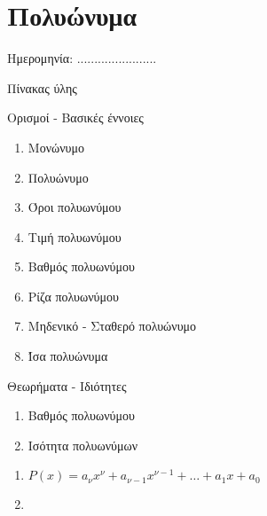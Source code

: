 \documentclass[twoside,nofonts,internet,math,spyros]{frontisthrio}
\newcommand{\myitem}{\stepcounter{enumi}\item[\raisebox{0.5mm}{\faExclamationTriangle}\ \Large$\square$]}
\begin{document}
\section{Πολυώνυμα}
\begin{flushright}
\faCalendar* Ημερομηνία: .......................
\end{flushright}
\begin{mybox}[mysubtitle]{Πίνακας ύλης}
\begin{tcbraster}[raster columns=2,raster equal height]
\begin{myleftbox}{Ορισμοί - Βασικές έννοιες\ \ \faBook}
\begin{enumerate}[itemsep=0mm]
\item Μονώνυμο
\item Πολυώνυμο
\item Όροι πολυωνύμου
\item Τιμή πολυωνύμου
\item Βαθμός πολυωνύμου
\item Ρίζα πολυωνύμου
\item Μηδενικό - Σταθερό πολυώνυμο
\item Ίσα πολυώνυμα
\end{enumerate}
\end{myleftbox}
\begin{myrightbox}{Θεωρήματα - Ιδιότητες\ \ \faTools}
\begin{enumerate}[itemsep=0mm]
\item Βαθμός πολυωνύμου
\item Ισότητα πολυωνύμων
\end{enumerate}
\end{myrightbox}
\end{tcbraster}
\begin{multicols}{2}
\begin{todolist}[itemsep=0mm]
\myitem 
\end{todolist}
\end{multicols}
\begin{multicols}{2}
\begin{enumerate}[itemsep=0mm,leftmargin=3mm]
\item $ P(x)=a_\nu x^\nu+a_{\nu-1}x^{\nu-1}+\ldots+a_1x+a_0 $
\item $  $
\end{enumerate}
\end{multicols}
\end{mybox}
\end{document}
